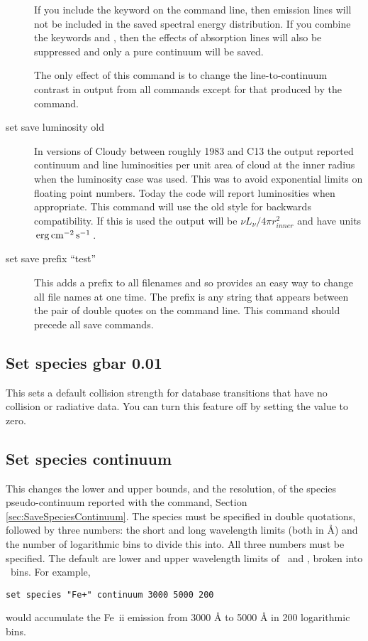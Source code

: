 \begin{description}
If you include the keyword  on the command line, then
emission lines will not be included in the saved spectral energy distribution.
If you combine the keywords  and , then
the effects of absorption lines will also be suppressed and only a pure continuum
will be saved.

The only effect of this command is to change the line-to-continuum
contrast in output from all  commands
except for that produced by the
 command.

\item[set save luminosity old]  
\label{sec:SetSaveLuminosity}
In versions of Cloudy between
roughly 1983 and C13 the  output
reported continuum and line luminosities per unit area of
cloud at the inner radius when the luminosity case was used.
This was to avoid exponential limits on floating point numbers.
Today the code will report luminosities when appropriate.
This command will use the old style for backwards compatibility.
If this is used the  output will be
$\nu L_{\nu} / 4 \pi r_{inner}^2$ and have units $\mbox{${\rm\thinspace erg}{\rm\thinspace cm}^{-2}{\rm\thinspace s}^{-1}\,$}$.

\item[set save prefix ``test'']  This adds a prefix
to all filenames and so
provides an easy way to change all file names at one time.
\label{sec:CommandSetSavePrefix}
The prefix is any string that appears between the pair of
double quotes on the command line. This command should precede
all save commands.

\end{description}

\subsection{Set species gbar 0.01}
This sets a default collision strength for database transitions that have 
no collision or radiative data.
You can turn this feature off by setting the value to zero.

\subsection{Set species continuum}
\label{sec:SetSpeciesContinuum}

\par
This changes the lower and upper bounds, and the resolution,
of the species pseudo-continuum reported with the
 command,
Section \ref{sec:SaveSpeciesContinuum}.
The species must be specified in double quotations, followed
by three numbers: the short and long wavelength limits
(both in \AA ) and the number of logarithmic bins to
divide this into.
All three numbers must be specified.
The default are lower and upper wavelength limits of
\speciesConWlLo\ and \speciesConWlHi,
broken into \speciesConNbins\ bins.
For example,
%
\begin{verbatim}
set species "Fe+" continuum 3000 5000 200
\end{verbatim}
%
would accumulate the Fe~{\sc ii} emission from 3000 \AA{}
to 5000 \AA{} in 200 logarithmic bins.


